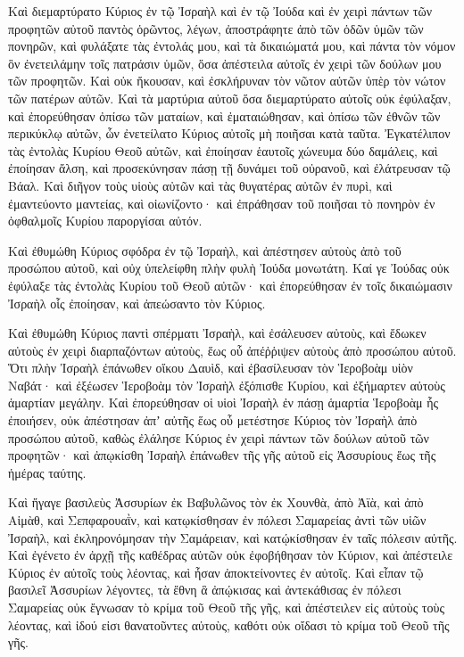 {\par }{\PP {}Καὶ διεμαρτύρατο Κύριος ἐν τῷ Ἰσραὴλ καὶ ἐν τῷ Ἰούδα καὶ ἐν χειρὶ πάντων τῶν προφητῶν αὐτοῦ παντὸς ὁρῶντος, λέγων, ἀποστράφητε ἀπὸ τῶν ὁδῶν ὑμῶν τῶν πονηρῶν, καὶ φυλάξατε τὰς ἐντολάς μου, καὶ τὰ δικαιώματά μου, καὶ πάντα τὸν νόμον ὃν ἐνετειλάμην τοῖς πατράσιν ὑμῶν, ὅσα ἀπέστειλα αὐτοῖς ἐν χειρὶ τῶν δούλων μου τῶν προφητῶν.
Καὶ οὐκ ἤκουσαν, καὶ ἐσκλήρυναν τὸν νῶτον αὐτῶν ὑπὲρ τὸν νώτον τῶν πατέρων αὐτῶν.
Καὶ τὰ μαρτύρια αὐτοῦ ὅσα διεμαρτύρατο αὐτοῖς οὐκ ἐφύλαξαν, καὶ ἐπορεύθησαν ὀπίσω τῶν ματαίων, καὶ ἐματαιώθησαν, καὶ ὀπίσω τῶν ἐθνῶν τῶν περικύκλῳ αὐτῶν, ὧν ἐνετείλατο Κύριος αὐτοῖς μὴ ποιῆσαι κατὰ ταῦτα.
Ἐγκατέλιπον τὰς ἐντολὰς Κυρίου Θεοῦ αὐτῶν, καὶ ἐποίησαν ἑαυτοῖς χώνευμα δύο δαμάλεις, καὶ ἐποίησαν ἄλση, καὶ προσεκύνησαν πάσῃ τῇ δυνάμει τοῦ οὐρανοῦ, καὶ ἐλάτρευσαν τῷ Βάαλ.
Καὶ διῆγον τοὺς υἱοὺς αὐτῶν καὶ τὰς θυγατέρας αὐτῶν ἐν πυρὶ, καὶ ἐμαντεύοντο μαντείας, καὶ οἰωνίζοντο· καὶ ἐπράθησαν τοῦ ποιῆσαι τὸ πονηρὸν ἐν ὀφθαλμοῖς Κυρίου παροργίσαι αὐτόν.
\par }{\PP {}Καὶ ἐθυμώθη Κύριος σφόδρα ἐν τῷ Ἰσραὴλ, καὶ ἀπέστησεν αὐτοὺς ἀπὸ τοῦ προσώπου αὐτοῦ, καὶ οὐχ ὑπελείφθη πλὴν φυλὴ Ἰούδα μονωτάτη.
Καί γε Ἰούδας οὐκ ἐφύλαξε τὰς ἐντολὰς Κυρίου τοῦ Θεοῦ αὐτῶν· καὶ ἐπορεύθησαν ἐν τοῖς δικαιώμασιν Ἰσραὴλ οἷς ἐποίησαν, καὶ ἀπεώσαντο τὸν Κύριος.
\par }{\PP {}Καὶ ἐθυμώθη Κύριος παντὶ σπέρματι Ἰσραὴλ, καὶ ἐσάλευσεν αὐτοὺς, καὶ ἔδωκεν αὐτοὺς ἐν χειρὶ διαρπαζόντων αὐτοὺς, ἕως οὗ ἀπέῤῥιψεν αὐτοὺς ἀπὸ προσώπου αὐτοῦ.
Ὅτι πλὴν Ἰσραὴλ ἐπάνωθεν οἴκου Δαυὶδ, καὶ ἐβασίλευσαν τὸν Ἱεροβοὰμ υἱὸν Ναβάτ· καὶ ἐξέωσεν Ἱεροβοὰμ τὸν Ἰσραὴλ ἐξόπισθε Κυρίου, καὶ ἐξήμαρτεν αὐτοὺς ἁμαρτίαν μεγάλην.
Καὶ ἐπορεύθησαν οἱ υἱοὶ Ἰσραὴλ ἐν πάσῃ ἁμαρτία Ἱεροβοὰμ ἧς ἐποιήσεν, οὐκ ἀπέστησαν ἀπʼ αὐτῆς
ἕως οὗ μετέστησε Κύριος τὸν Ἰσραὴλ ἀπὸ προσώπου αὐτοῦ, καθὼς ἐλάλησε Κύριος ἐν χειρὶ πάντων τῶν δούλων αὐτοῦ τῶν προφητῶν· καὶ ἀπῳκίσθη Ἰσραὴλ ἐπάνωθεν τῆς γῆς αὐτοῦ εἰς Ἀσσυρίους ἕως τῆς ἡμέρας ταύτης.
\par }{\PP {}Καὶ ἤγαγε βασιλεὺς Ἀσσυρίων ἐκ Βαβυλῶνος τὸν ἐκ Χουνθὰ, ἀπὸ Ἀϊὰ, καὶ ἀπὸ Αἱμὰθ, καὶ Σεπφαρουαῒν, καὶ κατῳκίσθησαν ἐν πόλεσι Σαμαρείας ἀντὶ τῶν υἱῶν Ἰσραὴλ, καὶ ἐκληρονόμησαν τὴν Σαμάρειαν, καὶ κατῴκίσθησαν ἐν ταῖς πόλεσιν αὐτῆς.
Καὶ ἐγένετο ἐν ἀρχῇ τῆς καθέδρας αὐτῶν οὐκ ἐφοβήθησαν τὸν Κύριον, καὶ ἀπέστειλε Κύριος ἐν αὐτοῖς τοὺς λέοντας, καὶ ἦσαν ἀποκτείνοντες ἐν αὐτοῖς.
Καὶ εἶπαν τῷ βασιλεῖ Ἀσσυρίων λέγοντες, τὰ ἔθνη ἃ ἀπῴκισας καὶ ἀντεκάθισας ἐν πόλεσι Σαμαρείας οὐκ ἔγνωσαν τὸ κρίμα τοῦ Θεοῦ τῆς γῆς, καὶ ἀπέστειλεν εἰς αὐτοὺς τοὺς λέοντας, καὶ ἰδού εἰσι θανατοῦντες αὐτοὺς, καθότι οὐκ οἴδασι τὸ κρίμα τοῦ Θεοῦ τῆς γῆς.
}
